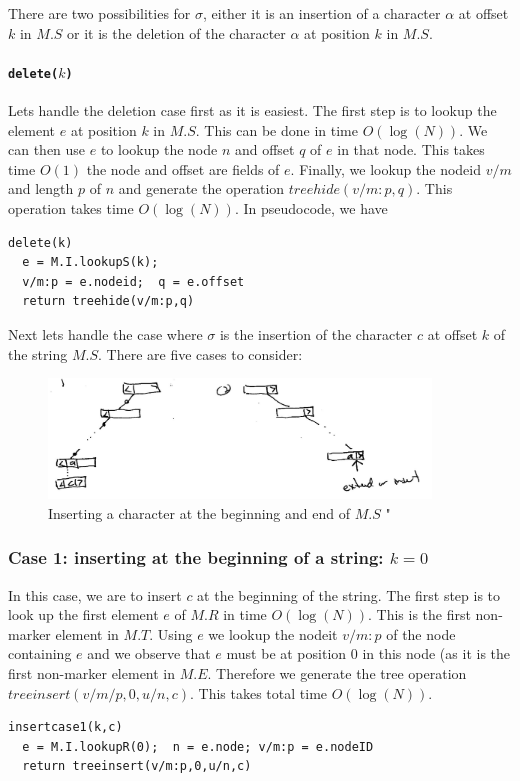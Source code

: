 \documentclass{amsart}
\begin{document}
There are two possibilities for $\sigma$, either it is an insertion of a character $\alpha$ at offset $k$ in $M.S$ or it is the deletion of the character $\alpha$ at position $k$ in $M.S$.  

\paragraph {{\tt delete($k$)}} 
Lets handle the deletion case first as it is easiest. The first step is to lookup the element $e$ at position $k$ in $M.S$. This can be done in time $O(\log(N))$.
We can then use $e$ to lookup the node $n$ and offset $q$ of $e$ in that node.
This takes time $O(1)$ the node and offset are fields of $e$. Finally, we lookup the
nodeid $v/m$ and length $p$ of $n$ and generate the operation $treehide(v/m:p,q)$. This operation takes time $O(\log(N))$. In pseudocode, we have
\begin{verbatim}
delete(k)
  e = M.I.lookupS(k);
  v/m:p = e.nodeid;  q = e.offset
  return treehide(v/m:p,q)
\end{verbatim}

Next lets handle the case where $\sigma$ is the insertion of the character $c$
at offset $k$ of the string $M.S$.  There are five cases to consider:

\begin{figure}[h]
\centering
\includegraphics[width=4.0in]{insertAtFront002.jpg}
\caption{Inserting a character at the beginning and end of $M.S$ \label{fig:frontinsert}"}
\end{figure}

\subsubsection{Case 1: inserting at the beginning of a string: $k=0$}
In this case, we are to insert $c$ at the beginning of the string.
The first step is to look up the first element $e$ of $M.R$ in time $O(\log(N))$.
This is the first non-marker element in $M.T$. Using $e$ we lookup the
nodeit $v/m:p$ of the node containing $e$ and we observe that $e$ must be at position 0 in this node (as it is the first non-marker element in $M.E$. Therefore
we generate the tree operation $treeinsert(v/m/p,0,u/n,c)$. This takes total time $O(\log(N))$.
\begin{verbatim}
insertcase1(k,c)
  e = M.I.lookupR(0);  n = e.node; v/m:p = e.nodeID
  return treeinsert(v/m:p,0,u/n,c)
\end{verbatim}
\end{document}
